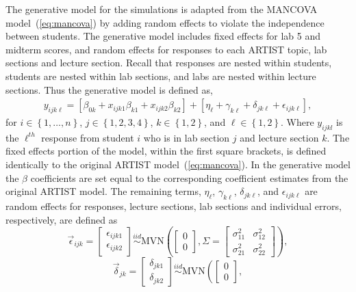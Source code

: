 \documentclass[11pt]{isuthesis}\usepackage[]{graphicx}\usepackage[]{color}
\newcommand{\distas}[1]{\mathbin{\overset{#1}{\sim}}}%
\newcommand{\km}[1]{{\color{red} #1}}
\begin{document}
\km{The generative model for the simulations is adapted from the MANCOVA model~(\ref{eq:mancova}) by adding random effects to violate the independence between students. The generative model includes fixed effects for lab 5 and midterm scores, and random effects for responses to each ARTIST topic, lab sections and lecture section. Recall that responses are nested within students, students are nested within lab sections, and labs are nested within lecture sections. Thus the generative model is defined as,
%
\begin{eqnarray}\label{eq:simgenerative}
y_{ijk\ell} = \left[ \beta_{0k} + x_{ijk1}\beta_{k1} + x_{ijk2}\beta_{k2} \right] + \left[ \eta_{\ell} + \gamma_{k\ell} + \delta_{jk\ell} + \epsilon_{ijk\ell} \right],
\end{eqnarray}
%
for $i \in \left\{1,\dots,n\right\}$, $j \in \left\{1,2,3,4\right\}$, $k \in \left\{1,2\right\}$, and $\ell \in \left\{1,2\right\}$.  Where $y_{ijkl}$ is the $\ell^{th}$ response from student $i$ who is in lab section $j$ and lecture section $k$. The fixed effects portion of the model, within the first square brackets, is defined identically to the original ARTIST model~(\ref{eq:mancova}). In the generative model the $\beta$ coefficients are set equal to the corresponding coefficient estimates from the original ARTIST model. The remaining terms, $\eta_{\ell}$, $\gamma_{k\ell}$, $\delta_{jk\ell}$, and $\epsilon_{ijk\ell}$ are random effects for responses, lecture sections, lab sections and individual errors, respectively, are defined as
%
\[
\vec{\epsilon}_{ijk} = 
\begin{bmatrix}
  \epsilon_{ijk1} \\ \epsilon_{ijk2} 
 \end{bmatrix}  
 \distas{iid} \text{MVN} \left( 
 \begin{bmatrix}
  0 \\ 0 
 \end{bmatrix},
 \Sigma = \begin{bmatrix}
  \sigma_{11}^2 & \sigma_{12}^2 \\ 
  \sigma_{21}^2 & \sigma_{22}^2
 \end{bmatrix} 
 \right),
\]
\[
\vec{\delta}_{jk} = 
\begin{bmatrix}
  \delta_{jk1} \\ \delta_{jk2} 
 \end{bmatrix}  
 \distas{iid} \text{MVN} \left( 
 \begin{bmatrix}
  0 \\ 0 
 \end{bmatrix},
\]}
\end{document}
